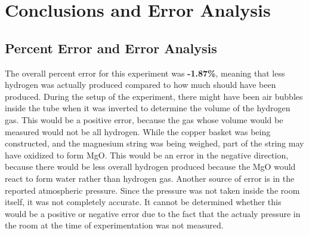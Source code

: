 \documentclass[11pt]{article}
\begin{document}
\section{Conclusions and Error Analysis}

\subsection{Percent Error and Error Analysis}
The overall percent error for this experiment was \textbf{-1.87\%}, meaning that less hydrogen was actually produced compared to how much should have been produced.
During the setup of the experiment, there might have been air bubbles inside the tube when it was inverted to determine the volume of the hydrogen gas. This would be a positive error, because the gas whose volume would be measured would not be all hydrogen. While the copper basket was being constructed, and the magnesium string was being weighed, part of the string may have oxidized to form MgO. This would be an error in the negative direction, because there would be less overall hydrogen produced because the MgO would react to form water rather than hydrogen gas. Another source of error is in the reported atmospheric pressure. Since the pressure was not taken inside the room itself, it was not completely accurate. It cannot be determined whether this would be a positive or negative error due to the fact that the actualy pressure in the room at the time of experimentation was not measured. 
\end{document}
